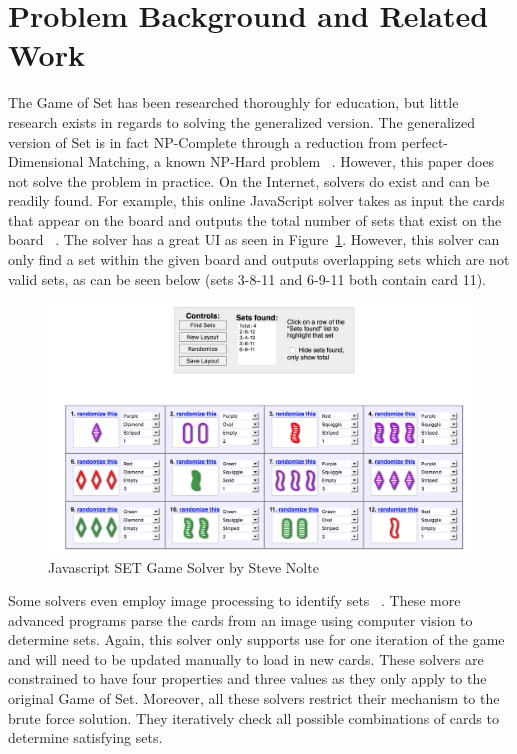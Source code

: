 \documentclass[pageno]{jpaper}
\begin{document}
\section{Problem Background and Related Work}


The Game of Set has been researched thoroughly for education, but little research exists in regards to solving the generalized version. The generalized version of Set is in fact NP-Complete through a reduction from perfect-Dimensional Matching, a known NP-Hard problem ~\cite{chaudhuri}. However, this paper does not solve the problem in practice. On the Internet, solvers do exist and can be readily found. For example, this online JavaScript solver takes as input the cards that appear on the board and outputs the total number of sets that exist on the board ~\cite{nolte}. The solver has a great UI as seen in Figure~\ref{fig:nolteUI}. However, this solver can only find a set within the given board and outputs overlapping sets which are not valid sets, as can be seen below (sets 3-8-11 and 6-9-11 both contain card 11). 

\begin{figure}[htbb]
\centering
\begin{minipage}[b]{.75\linewidth}
\includegraphics[width=\linewidth]{nolte.png}
\caption{Javascript SET Game Solver by Steve Nolte \cite{nolte}}
\label{fig:nolteUI}
\end{minipage}
\end{figure}


Some solvers even employ image processing to identify sets ~\cite{jorquera}. These more advanced programs parse the cards from an image using computer vision to determine sets. Again, this solver only supports use for one iteration of the game and will need to be updated manually to load in new cards. These solvers are constrained to have four properties and three values as they only apply to the original Game of Set. Moreover, all these solvers restrict their mechanism to the brute force solution. They iteratively check all possible combinations of cards to determine satisfying sets.
\end{document}
